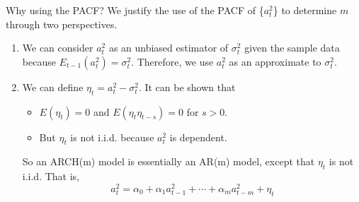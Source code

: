 \documentclass[presentation,10pt]{beamer}
\begin{document}
\begin{frame}[label={sec:org25793a0}]{Why using the PACF?}
We justify the use of the PACF of \{\(a^2_t\)\} to determine \(m\) through
two perspectives.

\vspace{0.2cm}

\begin{enumerate}
\item We can consider \(a^2_t\) as an unbiased estimator of \(\sigma^2_t\)
given the sample data because \(E_{t-1}(a^2_t) =
   \sigma^2_t\). Therefore, we use \(a^2_t\) as an approximate to
\(\sigma^2_t\).

\vspace{0.2cm}

\item We can define \(\eta_t = a^2_t - \sigma^2_t\). It can be shown that
\begin{itemize}
\item \(E(\eta_t) = 0\) and \(E(\eta_t \eta_{t-s})=0\) for \(s > 0\).
\item But \(\eta_t\) is not i.i.d. because \(a^2_t\) is dependent.
\end{itemize}
\vspace{0.2cm}

So an ARCH(m) model is essentially an AR(m) model, except
that \(\eta_t\) is not i.i.d. That is,
\[ a^2_t = \alpha_0 + \alpha_1 a^2_{t-1} + \cdots + \alpha_m
   a^2_{t-m} + \eta_t \]
\end{enumerate}
\end{frame}
\end{document}
